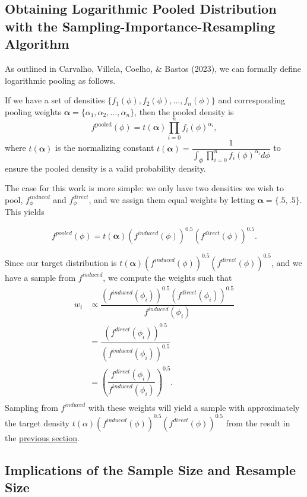 \documentclass[12pt,twoside]{smiththesis}
\begin{document}
\hypertarget{logpooled}{%
\subsection{Obtaining Logarithmic Pooled Distribution with the Sampling-Importance-Resampling Algorithm}\label{logpooled}}

As outlined in Carvalho, Villela, Coelho, \& Bastos (2023), we can formally define logarithmic pooling as follows.

If we have a set of densities \(\{ f_1(\phi), f_2(\phi), \ldots, f_n(\phi)\}\) and corresponding pooling weights \(\boldsymbol{\alpha}=\{\alpha_1, \alpha_2, \ldots, \alpha_n\}\), then the pooled density is
\[f^{\text{pooled}}(\phi) = t(\boldsymbol{\alpha}) \prod_{i=0}^n f_i(\phi)^{\alpha_i},\]
where \(t(\boldsymbol{\alpha})\) is the normalizing constant \(t(\boldsymbol{\alpha}) = \dfrac{1}{ \int_{\Phi}\prod_{i=0}^n f_i(\phi)^{\alpha_i} d\phi}\) to ensure the pooled density is a valid probability density.

The case for this work is more simple: we only have two densities we wish to pool, \(f_\phi^{induced}\) and \(f_\phi^{direct}\), and we assign them equal weights by letting \(\boldsymbol{\alpha} = \{.5, .5\}\). This yields

\[f^{pooled}(\phi) = t(\boldsymbol \alpha) \left( f^{induced} (\phi) \right)^{0.5} \left( f^{direct} (\phi) \right)^{0.5}.\]

Since our target distribution is \(t(\boldsymbol \alpha) \left( f^{induced} (\phi) \right)^{0.5} \left( f^{direct} (\phi) \right)^{0.5}\), and we have a sample from \(f^{induced}\), we compute the weights such that
\begin{align*} w_i &\propto \dfrac{ \left( f^{induced} (\phi_i) \right)^{0.5} \left( f^{direct} (\phi_i) \right)^{0.5} } {f^{induced}(\phi_i)} \\
&=  \dfrac{ \left( f^{direct} (\phi_i) \right)^{0.5} } {\left( f^{induced} (\phi_i) \right)^{0.5} } \\
&=   \left( \dfrac{  f^{direct} (\phi_i) } { f^{induced} (\phi_i) }  \right)^{0.5}. \\
\end{align*}
Sampling from \(f^{induced}\) with these weights will yield a sample with approximately the target density \(t(\alpha) \left(f^{induced} (\phi) \right)^{0.5} \left( f^{direct} (\phi)\right)^{0.5}\) from the result in the \protect\hyperlink{proof}{previous section}.

\hypertarget{presamp}{%
\subsection{Implications of the Sample Size and Resample Size}\label{presamp}}
\end{document}
